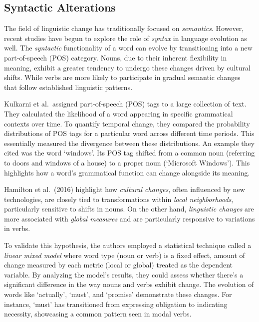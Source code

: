 \subsection{Syntactic Alterations} \label{subsec:syntactic-alterations}
The field of linguistic change has traditionally focused on \emph{semantics}.
However, recent studies have begun to explore the role of \emph{syntax} in language evolution as well.
The \emph{syntactic} functionality of a word can evolve by transitioning into a new part-of-speech (POS) category.
Nouns, due to their inherent flexibility in meaning, exhibit a greater tendency to undergo these changes driven by cultural shifts.
While verbs are more likely to participate in gradual semantic changes that follow established linguistic patterns. \cite{hamilton-etal-2016-cultural, hamilton-etal-2016-diachronic}

Kulkarni et al.\ assigned part-of-speech (POS) tags to a large collection of text.
They calculated the likelihood of a word appearing in specific grammatical contexts over time.
To quantify temporal change, they compared the probability distributions of POS tags for a particular word across different time periods.
This essentially measured the divergence between these distributions.
An example they cited was the word `windows'.
Its POS tag shifted from a common noun (referring to doors and windows of a house) to a proper noun (`Microsoft Windows').
This highlights how a word's grammatical function can change alongside its meaning.

Hamilton et al.\ (2016) highlight how \emph{cultural changes}, often influenced by new technologies, are closely tied to transformations within \emph{local neighborhoods}, particularly sensitive to shifts in nouns.
On the other hand, \emph{linguistic changes} are more associated with \emph{global measures} and are particularly responsive to variations in verbs.

To validate this hypothesis, the authors employed a statistical technique called a \emph{linear mixed model} where word type (noun or verb) is a fixed effect,
amount of change measured by each metric (local or global) treated as the dependent variable.
By analyzing the model's results, they could assess whether there's a significant difference in the way nouns and verbs exhibit change.
The evolution of words like `actually', `must', and `promise' demonstrate these changes.
For instance, `must' has transitioned from expressing obligation to indicating necessity, showcasing a common pattern seen in modal verbs.

